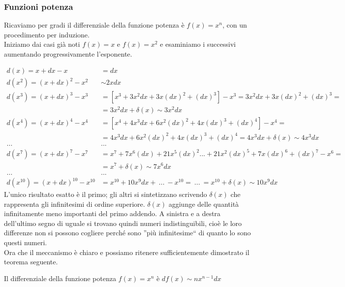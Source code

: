 \subsubsection{Funzioni potenza}
\label{subsubsec:diff01_diffpot}
Ricaviamo per gradi il differenziale della funzione potenza è $f(x)=x^n$, con
un procedimento per induzione.\\
Iniziamo dai casi già noti $f(x)=x$ e $f(x)=x^2$ e esaminiamo i successivi
aumentando progressivamente l'esponente.

\begin{align*}
  d(x)=x+dx-x & =dx\\
  d(x^2)=(x+dx)^2-x^2 & \sim 2xdx\\
  d(x^3)=(x+dx)^3-x^3 & =[x^3+3x^2dx+3x(dx)^2+(dx)^3]-x^3=
                      3x^2dx+3x(dx)^2+(dx)^3=\\
                      &= 3x^2dx+\delta(x)\sim 3x^2dx\\
  d(x^4)=(x+dx)^4-x^4 & = [x^4+4x^3dx+6x^2(dx)^2+4x(dx)^3+(dx)^4]-x^4=\\
                      &=4x^3dx+6x^2(dx)^2+4x(dx)^3+(dx)^4=
                      4x^3dx+\delta(x)\sim 4x^3dx\\
  ...                 & ...\\
  d(x^7)=(x+dx)^7-x^7 & = x^7+7x^6(dx)+21x^5(dx)^2...+21x^2(dx)^5+7x(dx)^6+(dx)^7 - x^6=\\
  & = x^7+\delta(x)\sim 7x^6dx\\
  ...                 & ...\\
  d(x^{10})=(x+dx)^{10}-x^{10} & =x^{10}+10 x^9dx+\ ...\ -x^{10}=
  \ ...\ =x^{10} +\delta(x)\sim 10 x^9dx      
\end{align*}
L'unico risultato esatto è il primo; gli altri si sintetizzano scrivendo $\delta(x)$
che rappresenta gli infinitesimi di ordine superiore. $\delta(x)$ aggiunge
delle quantità infinitamente meno importanti del primo addendo.
A sinistra e a destra dell'ultimo segno di uguale si trovano quindi 
numeri indistinguibili, cioè le loro differenze non si possono cogliere perché
sono ''più infinitesime`` di quanto lo sono questi numeri.\\

Ora che il meccanismo è chiaro e possiamo ritenere sufficientemente dimostrato
il teorema seguente.

\begin{teorema}
 Il differenziale della funzione potenza $f(x)=x^n$ è $df(x)\sim nx^{n-1}dx$
\end{teorema}

